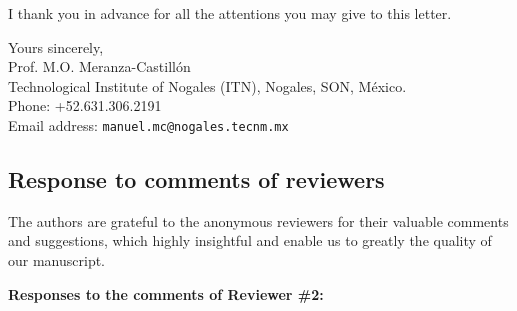 \documentclass{report}
\begin{document}
\begin{flushleft}
I thank you in advance for all the attentions you may give to this letter.
\end{flushleft} 

\vspace{0.8cm} %

\begin{flushright}
Yours sincerely, 
\\
Prof. M.O. Meranza-Castillón\\
Technological Institute of Nogales (ITN), Nogales, SON, M\'exico. \\	
Phone: +52.631.306.2191 \\
Email address: {\tt manuel.mc@nogales.tecnm.mx} \\ 
\end{flushright}

\newpage
{}

\begin{center}
\section*{Response to comments of reviewers}
\end{center}

\vspace{0.4cm} %

The authors are grateful to the anonymous reviewers for their valuable comments and suggestions, which highly insightful and enable us to greatly the quality of our manuscript.  

\vspace{0.4cm} %

\textbf{Responses to the comments of Reviewer \#2:} 
\\
\end{document}
